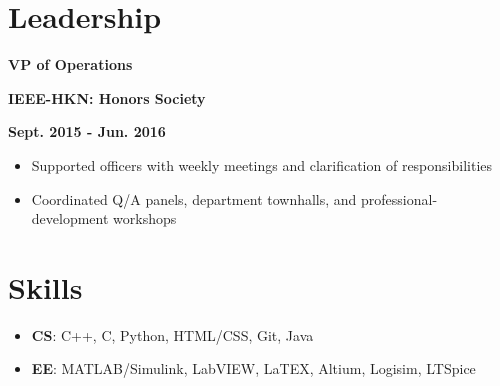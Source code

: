 \documentclass[12pt]{article}
\newcommand\textbox[1]{\parbox{.333\textwidth}{#1}}
\newcommand{\textlcr}[3]{\textbox{\textbf{#1}\hfill}\textbox{\hfil \textbf{#2}\hfil}\textbox{\hfill \textbf{#3}}}
\begin{document}
\section*{Leadership}
\vspace*{-1em}\makebox[\linewidth]{\rule{\textwidth}{0.4pt}}

\textlcr{VP of Operations}{IEEE-HKN: Honors Society}{Sept. 2015 - Jun. 2016}
\begin{itemize}
\item Supported officers with weekly meetings and clarification of responsibilities
\item Coordinated Q/A panels, department townhalls, and professional-development workshops
\end{itemize}

\section*{Skills}
\vspace*{-1em}\makebox[\linewidth]{\rule{\textwidth}{0.4pt}}
\begin{itemize}
\item \textbf{CS}: C++, C, Python, HTML/CSS, Git, Java
\item \textbf{EE}: MATLAB/Simulink, LabVIEW, LaTEX, Altium, Logisim, LTSpice
\end{itemize}
\end{document}
